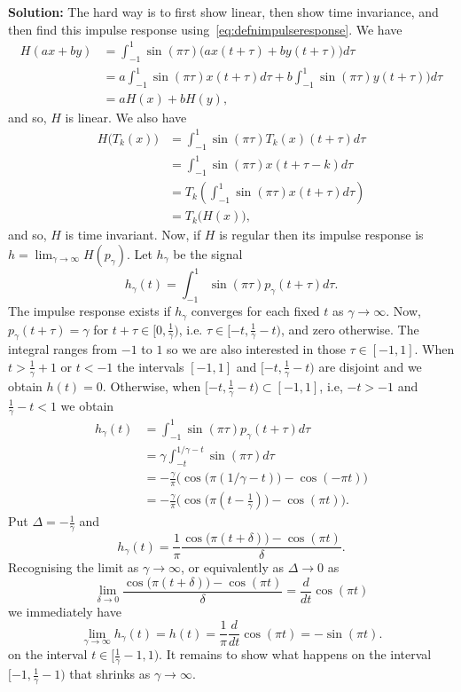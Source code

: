 \documentclass[11pt,a4paper]{book}
\theoremstyle{plain}
\numberwithin{equation}{section}
\newenvironment{solution}{\begin{footnotesize}\textbf{Solution:}}{\end{footnotesize}}
\newenvironment{excersizelist}{%
  \renewcommand*{\theenumi}{\thechapter.\arabic{enumi}}%
  \newcommand\itemadvanced{\stepcounter{enumi}\item[$\ast$\, \theenumi.]}
  \begin{enumerate}
}{%
  \end{enumerate}
}
\begin{document}
\begin{excersizelist}
\begin{solution}
The hard way is to first show linear, then show time invariance, and then find this impulse response using~\eqref{eq:defnimpulseresponse}.  We have
\begin{align*}
H(ax+by) &= \int_{-1}^{1} \sin(\pi\tau) \big( ax(t + \tau) + by(t + \tau) \big) d\tau \\
&= a \int_{-1}^{1} \sin(\pi\tau) x(t + \tau) d\tau + b\int_{-1}^{1} \sin(\pi\tau)  y(t + \tau) \big) d\tau \\
&= aH(x) + bH(y),
\end{align*}
and so, $H$ is linear.  We also have
\begin{align*}
H\big(T_k(x)\big) &= \int_{-1}^{1} \sin(\pi\tau) T_k(x)(t + \tau) d\tau \\
&= \int_{-1}^{1} \sin(\pi\tau) x(t + \tau - k) d\tau \\
&= T_k \left( \int_{-1}^{1} \sin(\pi\tau) x(t + \tau) d\tau   \right) \\
&= T_k\big(H(x)\big),
\end{align*}
and so, $H$ is time invariant.  Now, if $H$ is regular then its impulse response is $h = \lim_{\gamma \rightarrow \infty} H(p_\gamma)$.  Let $h_\gamma$ be the signal
\[
h_\gamma(t) = \int_{-1}^{1} \sin(\pi\tau) p_\gamma(t + \tau) d\tau.
\]
The impulse response exists if $h_\gamma$ converges for each fixed $t$ as $\gamma \to \infty$.  %
Now, $p_\gamma(t+\tau) = \gamma$ for $t + \tau \in [0, \tfrac{1}{\gamma})$, i.e. $\tau \in [-t, \tfrac{1}{\gamma}-t)$, and zero otherwise.  The integral ranges from $-1$ to $1$ so we are also interested in those $\tau \in [-1,1]$.  When $t > \tfrac{1}{\gamma} +1$ or $t < -1$ the intervals $[-1,1]$ and  $[-t, \tfrac{1}{\gamma}-t)$ are disjoint and we obtain $h(t) = 0$.  Otherwise, when $[-t, \tfrac{1}{\gamma} - t) \subset [-1,1]$, i.e, $-t > -1$ and $\tfrac{1}{\gamma} - t < 1$ we obtain
\begin{align*}
h_\gamma(t) &= \int_{-1}^{1} \sin(\pi\tau) p_\gamma(t + \tau) d\tau \\
&= \gamma \int_{-t}^{1/\gamma - t} \sin(\pi\tau) d\tau \\
&= - \frac{\gamma}{\pi} \big( \cos\big(\pi(1/\gamma - t)\big) - \cos(-\pi t) \big) \\
&= - \frac{\gamma}{\pi} \big( \cos\big(\pi(t - \tfrac{1}{\gamma})\big) - \cos(\pi t) \big).
\end{align*}
Put $\Delta = -\tfrac{1}{\gamma}$ and 
\[
h_\gamma(t) = \frac{1}{\pi} \frac{ \cos\big(\pi(t + \delta)\big) - \cos(\pi t) }{\delta}.
\]
Recognising the limit as $\gamma \to \infty$, or equivalently as $\Delta \to 0$ as
\[
\lim_{\delta \to 0} \frac{ \cos\big(\pi(t + \delta)\big) - \cos(\pi t) }{\delta} = \frac{d}{dt} \cos(\pi t)
\]
we immediately have
\[
\lim_{\gamma \to \infty} h_\gamma(t) = h(t) =\frac{1}{\pi} \frac{d}{dt} \cos(\pi t) = -\sin(\pi t).
\]
on the interval $t \in [\tfrac{1}{\gamma}-1 ,1)$.  It remains to show what happens on the interval $[-1, \tfrac{1}{\gamma}-1)$ that shrinks as $\gamma \to \infty$.


\end{solution}
\end{excersizelist}
\end{document}
